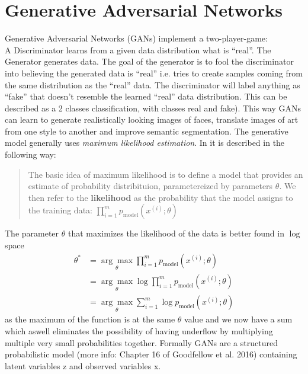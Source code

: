 \section{Generative Adversarial Networks}
Generative Adversarial Networks (GANs) implement a two-player-game:\\
A Discriminator learns from a given data distribution what is ``real''. The Generator generates data. The goal of the generator is to fool the discriminator into believing the generated data is ``real'' i.e. tries to create samples coming from the same distribution as the ``real'' data. The discriminator will label anything as ``fake'' that doesn't resemble the learned ``real'' data distribution. This can be described as a 2 classes classification, with classes real and fake). This way GANs can learn to generate realistically looking images of faces, translate images of art from one style to another and improve semantic segmentation.
The generative model generally uses \textit{maximum likelihood estimation}. In \cite{DBLP:journals/corr/Goodfellow17} it is described in the following way:
\begin{quote}
	The basic idea of maximum likelihood is to define a model that provides an estimate of probability distribituion, parametereized by parameters $\theta$. We then refer to the \textbf{likelihood} as the probability that the model assigns to the training data: $\prod_{i=1}^{m}p_{\text{model}}(x^{(i)}; \theta)$
\end{quote}
The parameter $\theta$ that maximizes the likelihood of the data is better found in $\log$ space
\begin{align}
	\theta^* &= \underset{\theta}{\arg \max} \prod_{i = 1}^{m} p_{\text{model}} (x^{(i)}; \theta)\\
	&= \underset{\theta}{\arg \max} \log \prod_{i=1}^{m} p_{\text{model}}(x^{(i)}; \theta)\\
	&= \underset{\theta}{\arg \max} \sum_{i = 1}^{m} \log p_{\text{model}}(x^{(i)}; \theta)
\end{align}
as the maximum of the function is at the same $\theta$ value and we now have a sum which aswell eliminates the possibility of having underflow by multiplying multiple very small probabilities together.
Formally GANs are a structured probabilistic model (more info: Chapter 16 of Goodfellow et al. 2016) containing latent variables z and observed variables x.
